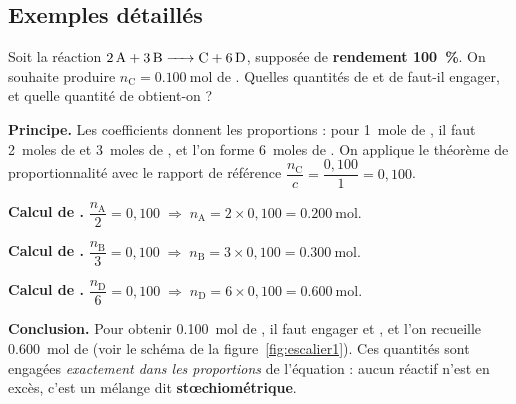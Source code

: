 \documentclass[11pt,a4paper]{article}
\newcommand{\nq}[1]{n_{\text{#1}}}        %
\begin{document}
\subsection{Exemples détaillés}

\begin{exemple}
Soit la réaction $\ce{2 A + 3 B -> C + 6 D}$, supposée de \textbf{rendement \SI{100}{\percent}}. On
souhaite produire $\nq{C}=\SI{0,100}{\mole}$ de . Quelles quantités de  et de 
faut-il engager, et quelle quantité de  obtient-on ?

\smallskip
\textbf{Principe.} Les coefficients donnent les proportions : pour 1~mole de , il faut 2~moles
de  et 3~moles de , et l'on forme 6~moles de . On applique le théorème de
proportionnalité avec le rapport de référence $\dfrac{\nq{C}}{c}=\dfrac{0,100}{1}=0,100$.

\textbf{Calcul de .} \;$\dfrac{\nq{A}}{2}=0,100 \;\Rightarrow\; \nq{A}=2\times0,100=\SI{0,200}{\mole}.$

\textbf{Calcul de .} \;$\dfrac{\nq{B}}{3}=0,100 \;\Rightarrow\; \nq{B}=3\times0,100=\SI{0,300}{\mole}.$

\textbf{Calcul de .} \;$\dfrac{\nq{D}}{6}=0,100 \;\Rightarrow\; \nq{D}=6\times0,100=\SI{0,600}{\mole}.$

\textbf{Conclusion.} Pour obtenir \SI{0,100}{\mole} de , il faut engager
 et , et l'on
recueille \SI{0,600}{\mole} de  (voir le schéma de la figure~\ref{fig:escalier1}). Ces
quantités sont engagées \emph{exactement dans les proportions} de l'équation : aucun réactif n'est
en excès, c'est un mélange dit \textbf{stœchiométrique}.
\end{exemple}
\end{document}
